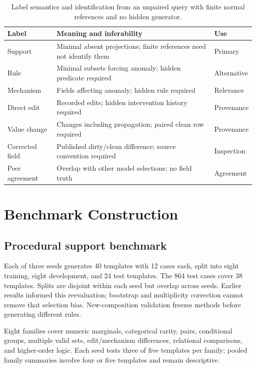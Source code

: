 \documentclass[conference]{IEEEtran}
\begin{document}
\begin{table}[t]
\centering
\caption{Label semantics and identification from an unpaired query with finite normal references and no hidden generator.}
\begin{tabularx}{\columnwidth}{|l|>{\raggedright\arraybackslash}X|>{\raggedright\arraybackslash}p{1.65cm}|}
\hline
Label & Meaning and inferability & Use \\
\hline
Support & Minimal absent projections; finite references need not identify them & Primary \\
Rule & Minimal subsets forcing anomaly; hidden predicate required & Alternative \\
Mechanism & Fields affecting anomaly; hidden rule required & Relevance \\
Direct edit & Recorded edits; hidden intervention history required & Provenance \\
Value change & Changes including propagation; paired clean row required & Provenance \\
Corrected field & Published dirty/clean difference; source convention required & Inspection \\
Peer agreement & Overlap with other model selections; no field truth & Agreement \\
\hline
\end{tabularx}
\label{tab:semantics}
\end{table}



\section{Benchmark Construction}
\subsection{Procedural support benchmark}

Each of three seeds generates 40 templates with 12 cases each, split into eight training, eight development, and 24 test templates. The 864 test cases cover 38 templates. Splits are disjoint within each seed but overlap across seeds. Earlier results informed this reevaluation; bootstrap and multiplicity correction cannot remove that selection bias. New-composition validation freezes methods before generating different rules.

Eight families cover numeric marginals, categorical rarity, pairs, conditional groups, multiple valid sets, edit/mechanism differences, relational comparisons, and higher-order logic. Each seed tests three of five templates per family; pooled family summaries involve four or five templates and remain descriptive.
\end{document}
